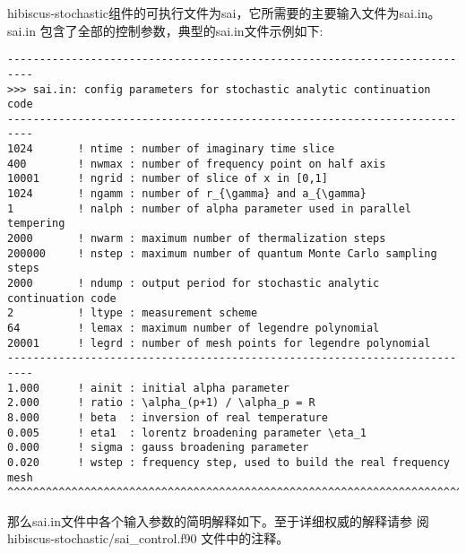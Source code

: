hibiscus-stochastic组件的可执行文件为sai，它所需要的主要输入文件为sai.in。sai.in
包含了全部的控制参数，典型的sai.in文件示例如下:

\begin{lstlisting}[frame=single]
--------------------------------------------------------------------------
>>> sai.in: config parameters for stochastic analytic continuation code
--------------------------------------------------------------------------
1024       ! ntime : number of imaginary time slice
400        ! nwmax : number of frequency point on half axis
10001      ! ngrid : number of slice of x in [0,1]
1024       ! ngamm : number of r_{\gamma} and a_{\gamma}
1          ! nalph : number of alpha parameter used in parallel tempering
2000       ! nwarm : maximum number of thermalization steps
200000     ! nstep : maximum number of quantum Monte Carlo sampling steps
2000       ! ndump : output period for stochastic analytic continuation code
2          ! ltype : measurement scheme
64         ! lemax : maximum number of legendre polynomial
20001      ! legrd : number of mesh points for legendre polynomial
--------------------------------------------------------------------------
1.000      ! ainit : initial alpha parameter
2.000      ! ratio : \alpha_(p+1) / \alpha_p = R
8.000      ! beta  : inversion of real temperature
0.005      ! eta1  : lorentz broadening parameter \eta_1
0.000      ! sigma : gauss broadening parameter
0.020      ! wstep : frequency step, used to build the real frequency mesh
^^^^^^^^^^^^^^^^^^^^^^^^^^^^^^^^^^^^^^^^^^^^^^^^^^^^^^^^^^^^^^^^^^^^^^^^^^
\end{lstlisting}

那么sai.in文件中各个输入参数的简明解释如下。至于详细权威的解释请参
阅hibiscus-stochastic/sai\_control.f90
文件中的注释。

